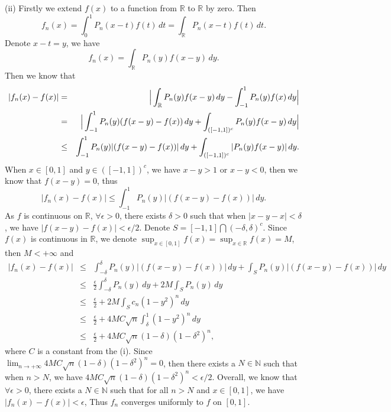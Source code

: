 \documentclass[12pt,a4paper]{ctexart}
\begin{document}
(ii) Firstly we extend $f(x)$ to a function from $\mathbb{R}$ to $\mathbb{R}$ by zero. Then
\begin{equation*}
    f_{n}(x) = \int_{0}^{1} P_{n}(x-t) f(t) \, d t = \int_{\mathbb{R}}^{} P_{n}(x-t) f(t) \, d t.
\end{equation*}
Denote $x - t = y$, we have
\begin{equation*}
    f_{n}(x) = \int_{\mathbb{R}}^{} P_{n}(y) f(x - y) \, d y.
\end{equation*}
Then we know that
\begin{eqnarray*}
|f_{n}(x) - f(x)| &=& \Big{|}\int_{\mathbb{R}}^{} P_{n}(y) f(x - y) \, d y - \int_{-1}^{1} P_{n}(y) f(x) \, d y \Big{|}  \\
&=& \Big{|} \int_{-1}^{1} P_{n}(y) (f(x - y) - f(x)) \, d y + \int_{([-1,1])^{c}}^{} P_{n}(y) f(x-y) \, d y \Big{|} \\
&\leq& \int_{-1}^{1} P_{n}(y) | (f(x - y) - f(x))| \, d y + \int_{([-1,1])^{c}}^{} |P_{n}(y) f(x-y)| \, d y.
\end{eqnarray*}
When $x \in [0, 1]$ and $y \in ([-1, 1])^{c}$, we have $x - y > 1$ or $x - y < 0$, then we know that $f(x -y) = 0$, thus
\begin{equation*}
    |f_{n}(x) - f(x)| \leq \int_{-1}^{1} P_{n}(y) | (f(x - y) - f(x))| \, d y.
\end{equation*}
As $f$ is continuous on $\mathbb R$, $\forall \epsilon > 0$, there exists $\delta > 0$ such that when $|x - y -x| < \delta$, we have $|f(x-y) - f(x)| < \epsilon/2$. Denote $S = [-1,1] \bigcap (-\delta, \delta)^c$. Since $f(x)$ is continuous in $\mathbb{R}$, we denote $\sup_{x \in [0, 1]} f(x) = \sup_{x \in \mathbb R} f(x) = M$, then $M < + \infty$ and
\begin{eqnarray*}
|f_{n}(x) - f(x)| &\leq& \int_{-\delta}^{\delta} P_{n}(y) | (f(x - y) - f(x))| \, d y  + \int_{S}^{} P_{n}(y) | (f(x - y) - f(x))| \, d y  \\
&\leq& \frac{\epsilon}{2} \int_{-\delta}^{\delta} P_{n}(y) \, d y  + 2M \int_{S}^{} P_{n}(y) \, d y   \\
&\leq& \frac{\epsilon}{2} + 2M \int_{S}^{} c_{n} (1 - y^{2})^{n} \, d y   \\
&\leq& \frac{\epsilon}{2} + 4M C \sqrt{n} \int_{\delta}^{1} (1 - y^{2})^{n} \, d y   \\
&\leq& \frac{\epsilon}{2} + 4M C \sqrt{n} (1 - \delta)(1 - \delta^{2})^{n},
\end{eqnarray*}
where $C$ is a constant from the (i).
Since $\lim_{n \to + \infty} 4M C \sqrt{n} (1 - \delta)(1 - \delta^{2})^{n} = 0 $, then there exists a $N \in \mathbb{N}$ such that when $n > N$, we have $4M C \sqrt{n} (1 - \delta)(1 - \delta^{2})^{n} < \epsilon/2$. Overall, we know that $\forall \epsilon > 0$, there exists a $N \in \mathbb{N}$ such that for all $n > N$ and $x \in [0,1]$, we have $|f_{n}(x) - f(x)| < \epsilon$, Thus $f_{n}$ converges uniformly to $f$ on $[0,1]$.
\end{document}
